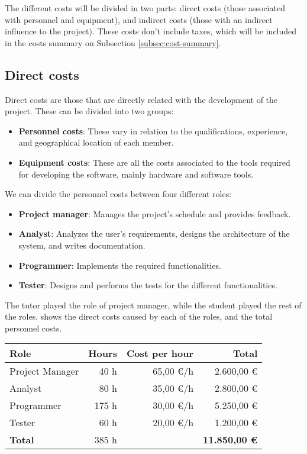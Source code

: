 \makeatother


The different costs will be divided in two parts: direct costs (those associated with personnel and equipment), and indirect costs (those with an indirect influence to the project). These costs don't include taxes, which will be included in the costs summary on Subsection \ref{subsec:cost-summary}.


\subsection{Direct costs}
Direct costs are those that are directly related with the development of the project. These can be divided into two groups:
\begin{itemize}
  \item \textbf{Personnel costs}: These vary in relation to the qualifications, experience, and geographical location of each member.
  \item \textbf{Equipment costs}: These are all the costs associated to the tools required for developing the software, mainly hardware and software tools.
\end{itemize}

\noindent
We can divide the personnel costs between four different roles:
\begin{itemize}
  \item \textbf{Project manager}: Manages the project's schedule and provides feedback.
  \item \textbf{Analyst}: Analyzes the user's requirements, designs the architecture of the system, and writes documentation.
  \item \textbf{Programmer}: Implements the required functionalities.
  \item \textbf{Tester}: Designs and performs the tests for the different functionalities.
\end{itemize}

The tutor played the role of project manager, while the student played the rest of the roles.  shows the direct costs caused by each of the roles, and the total personnel costs.

\begin{table}[htb]
    {
      \begin{tabular}{lrrr}
        \toprule
        \textbf{Role} & \textbf{Hours} & \textbf{Cost per hour} & \textbf{Total} \\
        \midrule
        Project Manager &  40 h & 65,00 €/h & 2.600,00 € \\
        Analyst         &  80 h & 35,00 €/h & 2.800,00 € \\
        Programmer      & 175 h & 30,00 €/h & 5.250,00 € \\
        Tester          &  60 h & 20,00 €/h & 1.200,00 € \\
        \midrule
        \textbf{Total}  & 385 h &           & \textbf{11.850,00 €} \\
        \bottomrule
      \end{tabular}
    }
\end{table}

